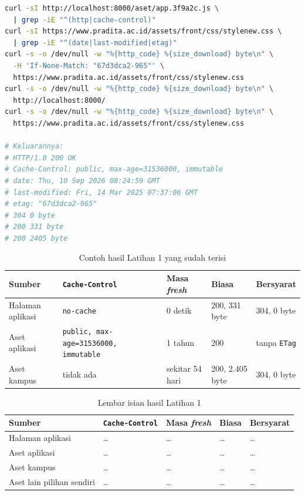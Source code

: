 \begin{lstlisting}[language=bash, caption={Membaca header dan mengunduh isi, dari aplikasi sendiri dan situs kampus}, label={lst:c4-lat1-jalan}]
curl -sI http://localhost:8000/aset/app.3f9a2c.js \
  | grep -iE "^(http|cache-control)"
curl -sI https://www.pradita.ac.id/assets/front/css/stylenew.css \
  | grep -iE "^(date|last-modified|etag)"
curl -s -o /dev/null -w "%{http_code} %{size_download} byte\n" \
  -H 'If-None-Match: "67d3dca2-965"' \
  https://www.pradita.ac.id/assets/front/css/stylenew.css
curl -s -o /dev/null -w "%{http_code} %{size_download} byte\n" \
  http://localhost:8000/
curl -s -o /dev/null -w "%{http_code} %{size_download} byte\n" \
  https://www.pradita.ac.id/assets/front/css/stylenew.css

# Keluarannya:
# HTTP/1.0 200 OK
# Cache-Control: public, max-age=31536000, immutable
# date: Thu, 10 Sep 2026 08:24:59 GMT
# last-modified: Fri, 14 Mar 2025 07:37:06 GMT
# etag: "67d3dca2-965"
# 304 0 byte
# 200 331 byte
# 200 2405 byte
\end{lstlisting}

\begin{table}[!htb]
  \centering
  \caption{Contoh hasil Latihan 1 yang sudah terisi}
  \label{tab:c4-lat1-contoh}
  \begin{tabularx}{\textwidth}{lXlll}
    \hline
    \textbf{Sumber} & \textbf{\texttt{Cache-Control}} & \textbf{Masa \textit{fresh}} & \textbf{Biasa} & \textbf{Bersyarat} \\
    \hline
    Halaman aplikasi & \texttt{no-cache} & 0 detik & 200, 331 byte & 304, 0 byte \\
    \hline
    Aset aplikasi & \texttt{public, max-age=31536000, immutable} & 1 tahun & 200 & tanpa \texttt{ETag} \\
    \hline
    Aset kampus & tidak ada & sekitar 54 hari & 200, 2.405 byte & 304, 0 byte \\
    \hline
  \end{tabularx}
\end{table}

\begin{table}[!htb]
  \centering
  \caption{Lembar isian hasil Latihan 1}
  \label{tab:c4-lat1-hasil}
  \begin{tabularx}{\textwidth}{lXlll}
    \hline
    \textbf{Sumber} & \textbf{\texttt{Cache-Control}} & \textbf{Masa \textit{fresh}} & \textbf{Biasa} & \textbf{Bersyarat} \\
    \hline
    Halaman aplikasi & \dots & \dots & \dots & \dots \\
    \hline
    Aset aplikasi & \dots & \dots & \dots & \dots \\
    \hline
    Aset kampus & \dots & \dots & \dots & \dots \\
    \hline
    Aset lain pilihan sendiri & \dots & \dots & \dots & \dots \\
    \hline
  \end{tabularx}
\end{table}

